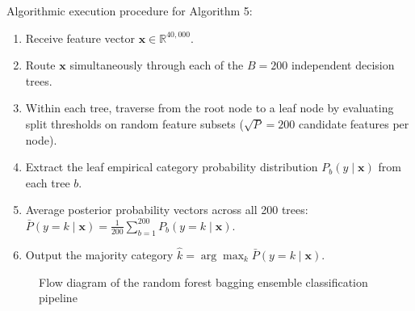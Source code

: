 \noindent Algorithmic execution procedure for Algorithm 5:
\begin{enumerate}
    \item Receive feature vector $\mathbf{x} \in \mathbb{R}^{40,000}$.
    \item Route $\mathbf{x}$ simultaneously through each of the $B = 200$ independent decision trees.
    \item Within each tree, traverse from the root node to a leaf node by evaluating split thresholds on random feature subsets ($\sqrt{P} = 200$ candidate features per node).
    \item Extract the leaf empirical category probability distribution $P_b(y \mid \mathbf{x})$ from each tree $b$.
    \item Average posterior probability vectors across all 200 trees: $\bar{P}(y = k \mid \mathbf{x}) = \frac{1}{200} \sum_{b=1}^{200} P_b(y = k \mid \mathbf{x})$.
    \item Output the majority category $\hat{k} = \arg\max_k \bar{P}(y = k \mid \mathbf{x})$.
\end{enumerate}

\begin{figure}[htbp]
\centering
{}
\caption{Flow diagram of the random forest bagging ensemble classification pipeline}\label{fig:tikz_random_forest}
\end{figure}

